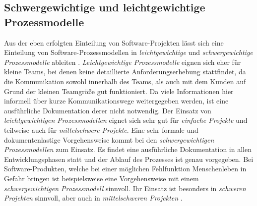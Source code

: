 \subsection{Schwergewichtige und leichtgewichtige Prozessmodelle}

Aus der eben erfolgten Einteilung von Software-Projekten lässt sich eine Einteilung von Software-Prozessmodellen in \textit{leichtgewichtige} und \textit{schwergewichtige Prozessmodelle} ableiten \cite{Hanser2010}. \newline
\textit{Leichtgewichtige Prozessmodelle} eignen sich eher für kleine Teams, bei denen keine detaillierte Anforderungserhebung stattfindet, da die Kommunikation sowohl innerhalb des Teams, als auch mit dem Kunden auf Grund der kleinen Teamgröße gut funktioniert. Da viele Informationen hier informell über kurze Kommunikationswege weitergegeben werden, ist eine ausführliche Dokumentation derer nicht notwendig. Der Einsatz von \textit{leichtgewichtigen Prozessmodellen} eignet sich sehr gut für \textit{einfache Projekte} und teilweise auch für \textit{mittelschwere Projekte}\cite{Hanser2010}. \newline
Eine sehr formale und dokumentenlastige Vorgehensweise kommt bei den \textit{schwergewichtigen Prozessmodellen} zum Einsatz. Es findet eine ausführliche Dokumentation in allen Entwicklungsphasen statt und der Ablauf des Prozesses ist genau vorgegeben. Bei Software-Produkten, welche bei einer möglichen Fehlfunktion Menschenleben in Gefahr bringen ist beispielsweise eine Vorgehensweise mit einem \textit{schwergewichtigen Prozessmodell} sinnvoll. Ihr Einsatz ist besonders in \textit{schweren Projekten} sinnvoll, aber auch in \textit{mittelschweren Projekten} \cite{Hanser2010}. \newline













